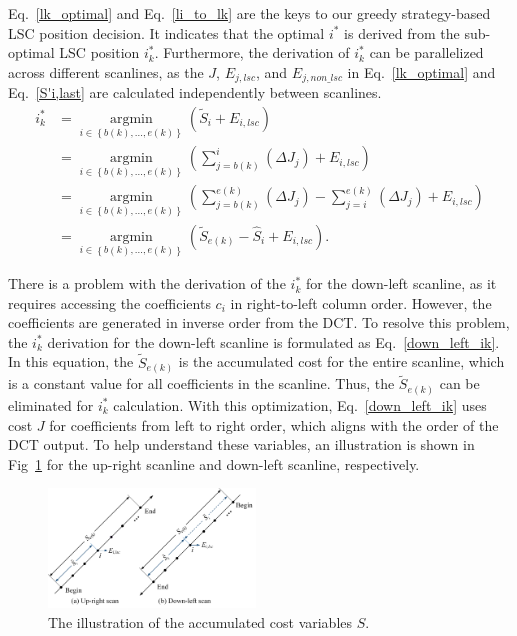 \documentclass[lettersize,journal]{IEEEtran}
\begin{document}
Eq.~\eqref{lk_optimal} and Eq.~\eqref{li_to_lk} are the keys to our greedy strategy-based LSC position decision. It indicates that the optimal $i^{*}$ is derived from the sub-optimal LSC position $i_{k}^{*}$. Furthermore, the derivation of $i_{k}^{*}$ can be parallelized across different scanlines, as the $J$, $E_{j,lsc}$, and $E_{j,non\_lsc}$ in Eq.~\eqref{lk_optimal} and Eq.~\eqref{S'i,last} are calculated independently between scanlines. 
  \begin{equation}
      \begin{aligned}
      \label{down_left_ik}
    i_{k}^{*} 
    &=\mathop{\arg\min}\limits_{i \in \left \{ b(k),...,e(k)\right \} } \left ( \widetilde{S}_{i}+ E_{i,lsc} \right ) \\
    &=\mathop{\arg\min}\limits_{i \in \left \{ b(k),...,e(k)\right \} } \left ( \sum_{j=b(k)}^{i} \left ( \Delta J_{j} \right) + E_{i,lsc} \right ) \\
    &=\mathop{\arg\min}\limits_{i \in \left \{ b(k),...,e(k)\right \} } \left ( \sum_{j=b(k)}^{e(k)} \left ( \Delta J_{j} \right )  - \sum_{j=i}^{e(k)} \left ( \Delta J_{j} \right ) + E_{i,lsc} \right ) \\
    &=\mathop{\arg\min}\limits_{i \in \left \{ b(k),...,e(k)\right \} } \left ( \widetilde{S}_{e(k)} - \hat{S}_{i}  + E_{i,lsc} \right ) .
      \end{aligned}
  \end{equation}
\par
There is a problem with the derivation of the $i_{k}^{*}$ for the down-left scanline, as it requires accessing the coefficients $c_{i}$ in right-to-left column order. However, the coefficients are generated in inverse order from the DCT. To resolve this problem, the $i_{k}^{*}$ derivation for the down-left scanline is formulated as Eq.~\eqref{down_left_ik}. In this equation, the $\widetilde{S}_{e(k)}$ is the accumulated cost for the entire scanline, which is a constant value for all coefficients in the scanline. Thus, the $\widetilde{S}_{e(k)}$ can be eliminated for $i_{k}^{*}$ calculation. With this optimization, Eq.~\eqref{down_left_ik} uses cost $J$ for coefficients from left to right order, which aligns with the order of the DCT output. To help understand these variables, an illustration is shown in Fig~\ref{abcompare} for the up-right scanline and down-left scanline, respectively. 
\begin{figure}[!ht]
	\centering
	\centerline{\includegraphics[width=0.49\textwidth]{figure/abcompare.png}} 
	\caption{The illustration of the accumulated cost variables $S$.}
	\label{abcompare} %
\end{figure}
\end{document}
